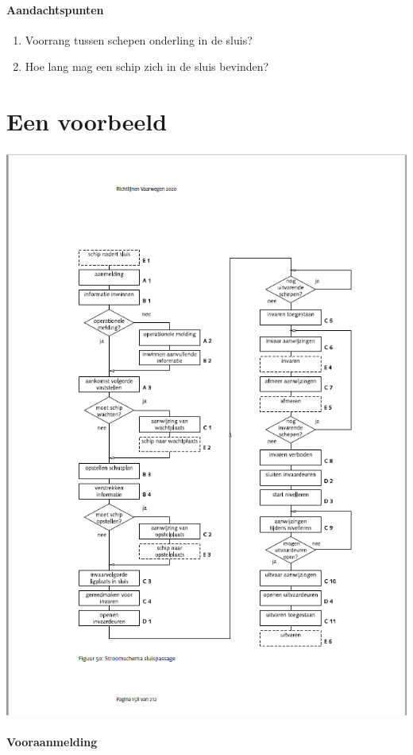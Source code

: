 \documentclass[11pt]{report} %
\begin{document}
 \paragraph{Aandachtspunten}
   \begin{enumerate}
 	\item Voorrang tussen schepen onderling in de sluis?
 	\item Hoe lang mag een schip zich in de sluis bevinden?
 \end{enumerate} 

\section{Een voorbeeld}

\includegraphics[scale=0.65]{sluispassage.png}

\paragraph{Vooraanmelding}
\end{document}
